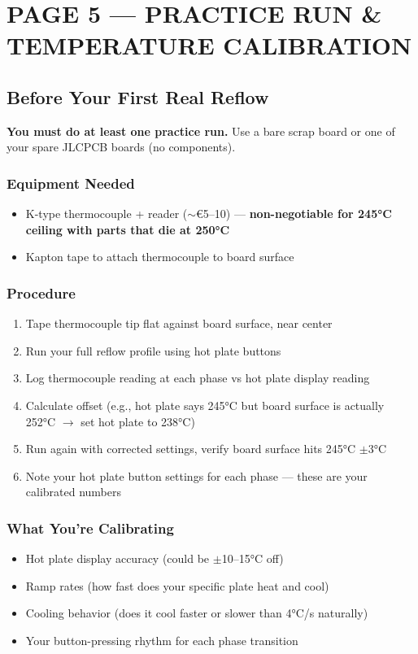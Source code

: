 \documentclass[11pt,a4paper]{article}
\begin{document}
\newpage
\section*{PAGE 5 — PRACTICE RUN \& TEMPERATURE CALIBRATION}

\subsection*{Before Your First Real Reflow}

\textbf{You must do at least one practice run.} Use a bare scrap board or one of your spare JLCPCB boards (no components).

\subsubsection*{Equipment Needed}
\begin{itemize}[nosep]
\item K-type thermocouple + reader ($\sim$\euro{}5--10) — \textbf{non-negotiable for 245°C ceiling with parts that die at 250°C}
\item Kapton tape to attach thermocouple to board surface
\end{itemize}

\subsubsection*{Procedure}
\begin{enumerate}[nosep]
\item Tape thermocouple tip flat against board surface, near center
\item Run your full reflow profile using hot plate buttons
\item Log thermocouple reading at each phase vs hot plate display reading
\item Calculate offset (e.g., hot plate says 245°C but board surface is actually 252°C $\rightarrow$ set hot plate to 238°C)
\item Run again with corrected settings, verify board surface hits 245°C $\pm$3°C
\item Note your hot plate button settings for each phase — these are your calibrated numbers
\end{enumerate}

\subsubsection*{What You're Calibrating}
\begin{itemize}[nosep]
\item Hot plate display accuracy (could be $\pm$10--15°C off)
\item Ramp rates (how fast does your specific plate heat and cool)
\item Cooling behavior (does it cool faster or slower than 4°C/s naturally)
\item Your button-pressing rhythm for each phase transition
\end{itemize}
\end{document}
